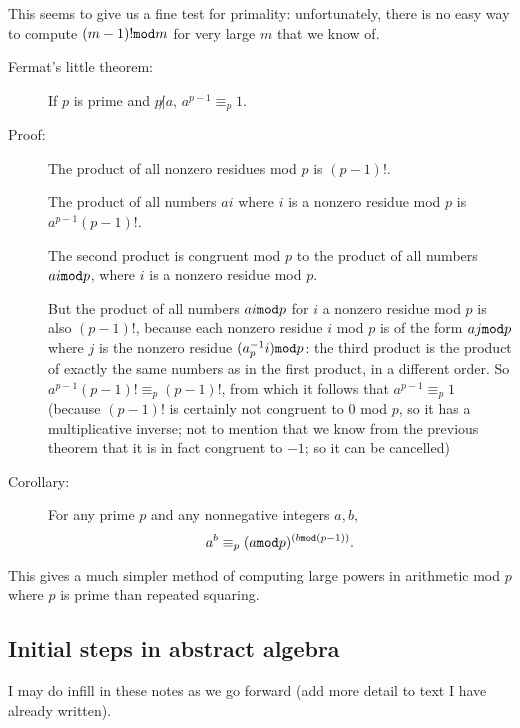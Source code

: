\documentclass[12pt]{article}
\begin{document}
This seems to give us a fine test for primality:  unfortunately, there is no easy way to compute $(m-1)! {\tt mod} m$ for very large $m$ that we know of.

\begin{description}

\item[Fermat's little theorem:]  If $p$ is prime and $p \not| a$, $a^{p-1}\equiv_p 1$.

\item[Proof:]  The product of all nonzero residues mod $p$ is $(p-1)!$.  

The product of all numbers $ai$ where $i$ is a nonzero residue mod $p$ is
$a^{p-1}(p-1)!$.  

The second product is congruent mod $p$ to the product of all numbers $ai {\tt mod} p$, where $i$ is a nonzero residue mod $p$.  

But the product of all numbers $ai {\tt mod} p$ for $i$ a nonzero residue mod $p$ is also $(p-1)!$, because each nonzero residue $i$ mod $p$ is of the form $aj {\tt mod}p$ where $j$ is the nonzero residue $(a^{-1}_pi ){\tt mod} p$:  the third product is the product of exactly the same numbers as in the first product, in a different order.  So $a^{p-1}(p-1)! \equiv_p (p-1)!$, from which it follows that
$a^{p-1}\equiv_p 1$ (because $(p-1)!$ is certainly not congruent to 0 mod $p$, so it has a multiplicative inverse;  not to mention that we know from the previous theorem that it is in fact congruent to $-1$;  so it can be cancelled)

\item[Corollary:]  For any prime $p$ and any nonnegative integers $a,b$, $$a^b \equiv_p (a {\tt mod} p)^{(b{\tt mod}(p-1))}.$$

\end{description}

This gives a much simpler method of computing large powers in arithmetic mod $p$ where $p$ is prime than repeated squaring.

\subsection{Initial steps in abstract algebra}

I may do infill in these notes as we go forward (add more detail to text I have already written).
\end{document}
